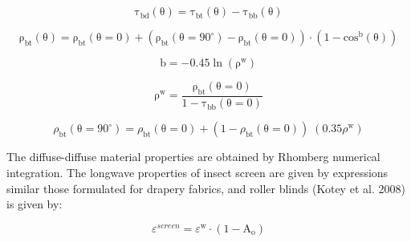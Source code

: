 {\begin{equation}
{\mathrm{\tau }}_{{\mathrm{bd}}}^{}\left( {\mathrm{\theta }} \right) = {\mathrm{\tau }}_{{\mathrm{bt}}}^{}\left( {\mathrm{\theta }} \right) - {\mathrm{\tau }}_{{\mathrm{bb}}}^{}\left( {\mathrm{\theta }} \right)
\end{equation}

\begin{equation}
{\mathrm{\rho }}_{{\mathrm{bt}}}^{}\left( {\mathrm{\theta }} \right) = {\mathrm{\rho }}_{{\mathrm{bt}}}^{}\left( {{\mathrm{\theta }} = {\mathrm{0}}} \right) + \left( {{\mathrm{\rho }}_{{\mathrm{bt}}}^{}\left( {{\mathrm{\theta }} = 9{\mathrm{0}}^\circ } \right) - {\mathrm{\rho }}_{{\mathrm{bt}}}^{}\left( {{\mathrm{\theta }} = {\mathrm{0}}} \right)} \right) \cdot \left( {1 - {\mathrm{co}}{{\mathrm{s}}^{\mathrm{b}}}\left( {\mathrm{\theta }} \right)} \right)
\end{equation}

\begin{equation}
{\mathrm{b}} =  - {\mathrm{0}}{\mathrm{.45}}\;{\mathrm{ln}}\;{\left( {{{\mathrm{\rho }}^{\mathrm{w}}}} \right)^{}}
\end{equation}

\begin{equation}
{\mathrm{\rho }}_{}^{\mathrm{w}} = \frac{{{\mathrm{\rho }}_{{\mathrm{bt}}}^{}\left( {{\mathrm{\theta }} = {\mathrm{0}}} \right)}}{{{\mathrm{1}} - {\mathrm{\tau }}_{{\mathrm{bb}}}^{}\left( {{\mathrm{\theta }} = {\mathrm{0}}} \right)}}
\end{equation}

\begin{equation}
{\rho_{{\mathrm{bt}}}}\left( {{\mathrm{\theta }} = {\mathrm{90}}^\circ } \right) = {\rho_{{\mathrm{bt}}}}\left( {{\mathrm{\theta }} = {\mathrm{0}}} \right) + \left( {1 - {\rho_{{\mathrm{bt}}}}\left( {{\mathrm{\theta }} = {\mathrm{0}}} \right)} \right)\;\left( {{\mathrm{0}}{\mathrm{.35}}{\rho ^{\mathrm{w}}}} \right)
\end{equation}

The diffuse-diffuse material properties are obtained by Rhomberg numerical integration. The longwave properties of insect screen are given by expressions similar those formulated for drapery fabrics, and roller blinds (Kotey et al. 2008) is given by:

\begin{equation}
{\varepsilon ^{screen}} = {\varepsilon ^{\mathrm{w}}} \cdot \left( {{\mathrm{1  -  }}{{\mathrm{A}}_{\mathrm{o}}}} \right)
\end{equation}

}
